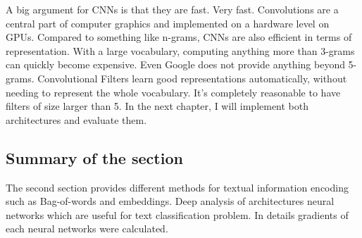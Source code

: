 A big argument for CNNs is that they are fast. Very fast. Convolutions are a central part of computer graphics and implemented on a hardware level on GPUs. Compared to something like n-grams, CNNs are also efficient in terms of representation. With a large vocabulary, computing anything more than 3-grams can quickly become expensive. Even Google does not provide anything beyond 5-grams. Convolutional Filters learn good representations automatically, without needing to represent the whole vocabulary. It’s completely reasonable to have filters of size larger than 5.\cite{wildml}
In the next chapter, I will implement both architectures and evaluate them.

\subsection{Summary of the section}



The second section provides different methods for textual information encoding such as Bag-of-words and embeddings. Deep analysis of architectures neural networks which are useful for text classification problem. In details gradients of each neural networks were calculated.   
